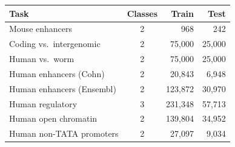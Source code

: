 \begin{tabular}{lcrr}
\toprule
Task & Classes & Train & Test \\
\midrule
Mouse enhancers & 2 & 968 & 242 \\
Coding vs.\ intergenomic & 2 & 75,000 & 25,000 \\
Human vs.\ worm & 2 & 75,000 & 25,000 \\
Human enhancers (Cohn) & 2 & 20,843 & 6,948 \\
Human enhancers (Ensembl) & 2 & 123,872 & 30,970 \\
Human regulatory & 3 & 231,348 & 57,713 \\
Human open chromatin & 2 & 139,804 & 34,952 \\
Human non-TATA promoters & 2 & 27,097 & 9,034 \\
\bottomrule
\end{tabular}
